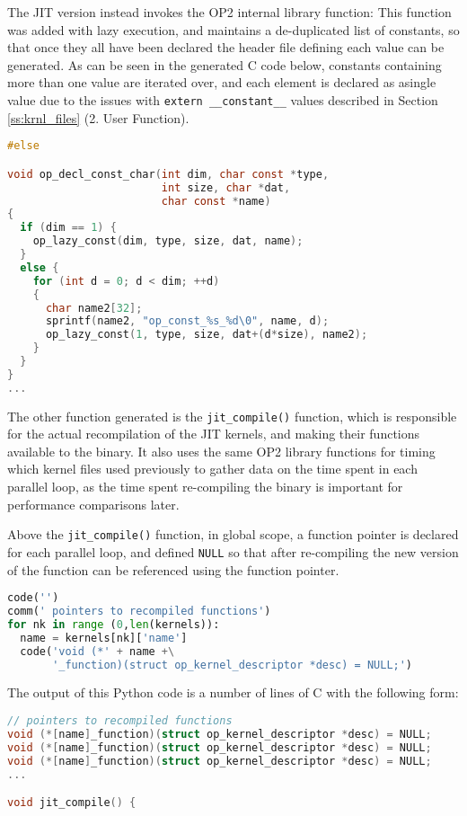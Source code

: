 The JIT version instead invokes the OP2 internal library function:
\noindent This function was added with lazy execution, and maintains a de-duplicated list of constants, so that once they all have been declared the header file defining each value can be generated. As can be seen in the generated C code below, constants containing more than one value are iterated over, and each element is declared as asingle value due to the issues with \verb|extern __constant__| values described in Section \ref{ss:krnl_files} (2. User Function).
\begin{lstlisting}[backgroundcolor=\color{red!20}, language=C]
#else

void op_decl_const_char(int dim, char const *type,
                        int size, char *dat,
                        char const *name)
{
  if (dim == 1) {
    op_lazy_const(dim, type, size, dat, name);
  }
  else {
    for (int d = 0; d < dim; ++d)
    {
      char name2[32];
      sprintf(name2, "op_const_%s_%d\0", name, d);
      op_lazy_const(1, type, size, dat+(d*size), name2);
    }
  }
}
...
\end{lstlisting}
\vspace{-1em}

The other function generated is the \verb|jit_compile()| function, which is responsible for the actual recompilation of the JIT kernels, and making their functions available to the binary. It also uses the same OP2 library functions for timing which kernel files used previously to gather data on the time spent in each parallel loop, as the time spent re-compiling the binary is important for performance comparisons later.
\par
Above the \verb|jit_compile()| function, in global scope, a function pointer is declared for each parallel loop, and defined \verb|NULL| so that after re-compiling the new version of the function can be referenced using the function pointer.

\begin{lstlisting}[backgroundcolor=\color{lightgray!20}, language=Python]
code('')
comm(' pointers to recompiled functions')
for nk in range (0,len(kernels)):
  name = kernels[nk]['name']
  code('void (*' + name +\
       '_function)(struct op_kernel_descriptor *desc) = NULL;')
\end{lstlisting}
\noindent The output of this Python code is a number of lines of C with the following form:
\begin{lstlisting}[backgroundcolor=\color{red!20}, language=C]
// pointers to recompiled functions
void (*[name]_function)(struct op_kernel_descriptor *desc) = NULL;
void (*[name]_function)(struct op_kernel_descriptor *desc) = NULL;
void (*[name]_function)(struct op_kernel_descriptor *desc) = NULL;
...

void jit_compile() {
\end{lstlisting}

